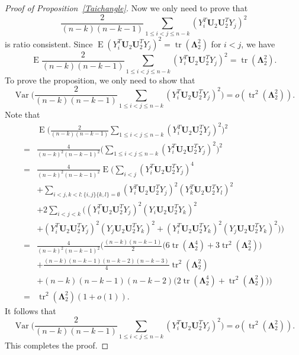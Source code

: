\documentclass[12pt]{article} %
\DeclareMathOperator{\mytr}{tr}
\DeclareMathOperator{\myE}{E}
\DeclareMathOperator{\myVar}{Var}
\newcommand{\bU}{\mathbf{U}}
\newcommand{\bfsym}[1]{\ensuremath{\boldsymbol{#1}}}
\def\bLambda {\bfsym {\Lambda}}
\theoremstyle{definition}
\begin{document}
\begin{appendices}
\begin{proof}[Proof of Proposition~\ref{Taichangle}]
        Now we only need to prove that
        $$
    \frac{2}{(n-k)(n-k-1)}\sum_{1\leq i<j\leq n-k}(Y_i^T \bU_2 \bU_2^T Y_j)^2 
        $$
        is ratio consistent.
        Since $\myE (Y_i^T \bU_2 \bU_2^T Y_j)^2=\mytr(\bLambda_2^2)$ for $i< j$, we have
    $$
        \myE
    \frac{2}{(n-k)(n-k-1)}\sum_{1\leq i<j\leq n-k}(Y_i^T \bU_2 \bU_2^T Y_j)^2 
        =\mytr(\bLambda_2^2).
        $$
        To prove the proposition, we only need to show that 
        $$
        \myVar
    \Big(
    \frac{2}{(n-k)(n-k-1)}\sum_{1\leq i<j\leq n-k}(Y_i^T \bU_2 \bU_2^T Y_j)^2 
    \Big)
        =o(\mytr^2(\bLambda_2^2)).
        $$
         Note that
         $$
        \begin{aligned}
            &\myE\Big(
    \frac{2}{(n-k)(n-k-1)}\sum_{1\leq i<j\leq n-k}(Y_i^T \bU_2 \bU_2^T Y_j)^2 
            \Big)^2\\
            =&
            \frac{4}{(n-k)^2(n-k-1)^2}\Big(\sum_{1\leq i < j\leq n-k}(Y_i^T \bU_2 \bU_2^T Y_j)^2\Big)^2\\
            =&
            \frac{4}{(n-k)^2(n-k-1)^2}\myE\Big( \sum_{i<j}(Y_i^T\bU_2 \bU_2^T Y_j)^4\\
            &+
            \sum_{i<j,k<l:\{i,j\}\{k,l\}=\emptyset}(Y_i^T\bU_2 \bU_2^T Y_j)^2 (Y_k^T\bU_2 \bU_2^T Y_l)^2\\
            &+2\sum_{i<j<k}\big((Y_i^T\bU_2 \bU_2^T Y_j)^2(Y_i\bU_2 \bU_2^T Y_k)^2\\
            &+(Y_i^T\bU_2 \bU_2^T Y_j)^2(Y_j\bU_2 \bU_2^T Y_k)^2+(Y_i^T\bU_2 \bU_2^T Y_k)^2(Y_j\bU_2 \bU_2^T Y_k)^2\big) \Big)\\
            =&
    \frac{4}{(n-k)^2(n-k-1)^2}\Big(
            \frac{(n-k)(n-k-1)}{2}\big(6\mytr(\bLambda_2^4)+3\mytr^2(\bLambda_2^2)\big)\\
            &+\frac{(n-k)(n-k-1)(n-k-2)(n-k-3)}{4}\mytr^2(\bLambda_2^2)\\
            &+(n-k)(n-k-1)(n-k-2)\big(2\mytr(\bLambda_2^4)
            +\mytr^2(\bLambda_2^2)\big)
            \Big)\\
            =&
            \mytr^2(\bLambda_2^2)(1+o(1)).
        \end{aligned}
         $$
        It follows that
        $$
        \myVar
    \Big(\frac{2}{(n-k)(n-k-1)}\sum_{1\leq i<j\leq n-k}(Y_i^T \bU_2 \bU_2^T Y_j)^2 
    \Big)
            =
            o(\mytr^2(\bLambda_2^2)).
        $$
        This completes the proof.
\end{proof}
\end{appendices}
%
\vskip 14pt
\end{document}
